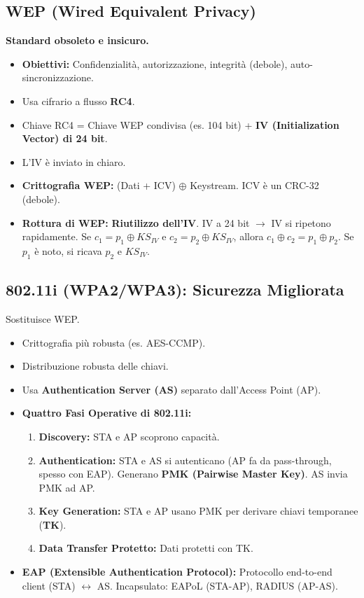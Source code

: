 \subsection{WEP (Wired Equivalent Privacy)}
\textbf{Standard obsoleto e insicuro.}
\begin{itemize}
    \item \textbf{Obiettivi:} Confidenzialità, autorizzazione, integrità (debole), auto-sincronizzazione.
    \item Usa cifrario a flusso \textbf{RC4}.
    \item Chiave RC4 = Chiave WEP condivisa (es. 104 bit) + \textbf{IV (Initialization Vector) di 24 bit}.
    \item L'IV è inviato in chiaro.
    \item \textbf{Crittografia WEP:} (Dati + ICV) $\oplus$ Keystream. ICV è un CRC-32 (debole).
    \item \textbf{Rottura di WEP:} \textbf{Riutilizzo dell'IV}. IV a 24 bit $\rightarrow$ IV si ripetono rapidamente.
    Se $c_1 = p_1 \oplus KS_{IV}$ e $c_2 = p_2 \oplus KS_{IV}$, allora $c_1 \oplus c_2 = p_1 \oplus p_2$.
    Se $p_1$ è noto, si ricava $p_2$ e $KS_{IV}$.
\end{itemize}

\subsection{802.11i (WPA2/WPA3): Sicurezza Migliorata}
Sostituisce WEP.
\begin{itemize}
    \item Crittografia più robusta (es. AES-CCMP).
    \item Distribuzione robusta delle chiavi.
    \item Usa \textbf{Authentication Server (AS)} separato dall'Access Point (AP).
    \item \textbf{Quattro Fasi Operative di 802.11i:}
    \begin{enumerate}
        \item \textbf{Discovery:} STA e AP scoprono capacità.
        \item \textbf{Authentication:} STA e AS si autenticano (AP fa da pass-through, spesso con EAP). Generano \textbf{PMK (Pairwise Master Key)}. AS invia PMK ad AP.
        \item \textbf{Key Generation:} STA e AP usano PMK per derivare chiavi temporanee (\textbf{TK}).
        \item \textbf{Data Transfer Protetto:} Dati protetti con TK.
    \end{enumerate}
    \item \textbf{EAP (Extensible Authentication Protocol):} Protocollo end-to-end client (STA) $\leftrightarrow$ AS.
    Incapsulato: EAPoL (STA-AP), RADIUS (AP-AS).
\end{itemize}

